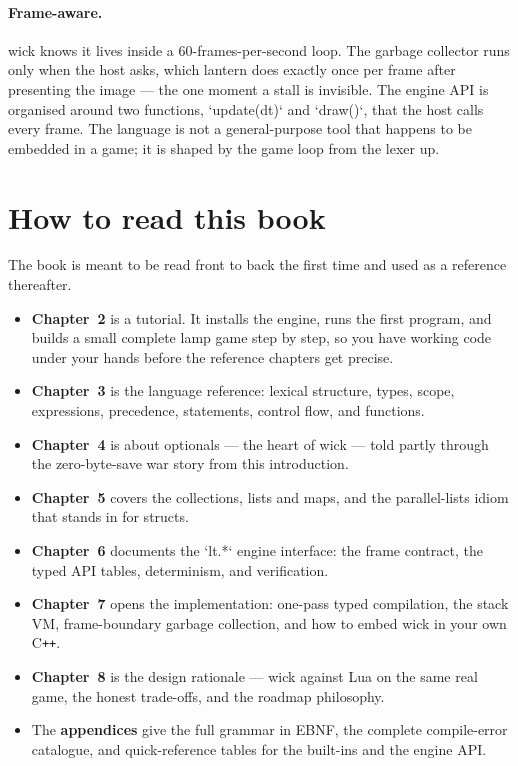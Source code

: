\paragraph{Frame-aware.} wick knows it lives inside a 60-frames-per-second
loop. The garbage collector runs only when the host asks, which lantern does
exactly once per frame after presenting the image --- the one moment a stall is
invisible. The engine API is organised around two functions, `update(dt)` and
`draw()`, that the host calls every frame. The language is not a
general-purpose tool that happens to be embedded in a game; it is shaped by
the game loop from the lexer up.

\section{How to read this book}

The book is meant to be read front to back the first time and used as a
reference thereafter.

\begin{itemize}
\item \textbf{Chapter~2} is a tutorial. It installs the engine, runs the
first program, and builds a small complete lamp game step by step, so you
have working code under your hands before the reference chapters get precise.
\item \textbf{Chapter~3} is the language reference: lexical structure, types,
scope, expressions, precedence, statements, control flow, and functions.
\item \textbf{Chapter~4} is about optionals --- the heart of wick --- told
partly through the zero-byte-save war story from this introduction.
\item \textbf{Chapter~5} covers the collections, lists and maps, and the
parallel-lists idiom that stands in for structs.
\item \textbf{Chapter~6} documents the `lt.*` engine interface: the frame
contract, the typed API tables, determinism, and verification.
\item \textbf{Chapter~7} opens the implementation: one-pass typed
compilation, the stack VM, frame-boundary garbage collection, and how to
embed wick in your own \mbox{C\texttt{++}}.
\item \textbf{Chapter~8} is the design rationale --- wick against Lua on the
same real game, the honest trade-offs, and the roadmap philosophy.
\item The \textbf{appendices} give the full grammar in EBNF, the complete
compile-error catalogue, and quick-reference tables for the built-ins and the
engine API.
\end{itemize}

